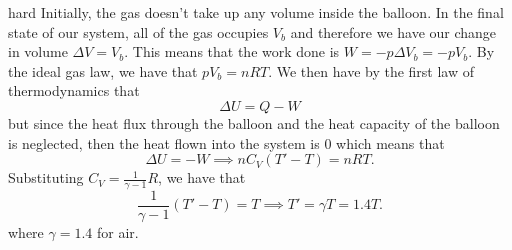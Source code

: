\begin{solution}{hard}
Initially, the gas doesn't take up any volume inside the balloon. In the final state of our system, all of the gas occupies $V_b$ and therefore we have our change in volume $\Delta V = V_b$. This means that the work done is $W = -p\Delta V_b = -pV_b$. By the ideal gas law, we have that $pV_b = nRT$. We then have by the first law of thermodynamics that
\[\Delta U = Q - W\]
but since the heat flux through the balloon and the heat capacity of the balloon is neglected, then the heat flown into the system is $0$ which means that
\[\Delta U = -W \implies n C_V(T' - T) = nRT.\]Substituting $C_V = \frac{1}{\gamma-1}R$, we have that
\[\frac{1}{\gamma-1}(T' - T) = T\implies T' = \gamma T = \boxed{1.4T}.\]
where $\gamma=1.4$ for air.
\end{solution}